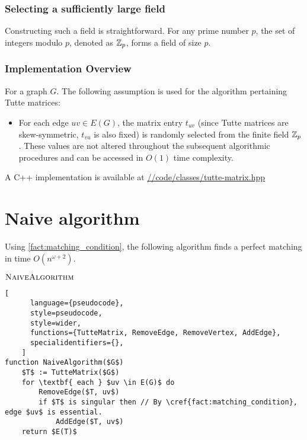 \subsubsection{Selecting a sufficiently large field}
Constructing such a field is straightforward. 
For any prime number \(p\), the set of integers modulo \(p\), denoted as \(\mathbb{Z}_{p}\), forms a field of size \(p\).

\subsubsection{Implementation Overview}

For a graph \(G\). The following assumption is used for the algorithm pertaining Tutte matrices:
\begin{itemize}
    \item For each edge \(uv \in E(G)\), the matrix entry \(t_{uv}\) (since Tutte matrices are skew-symmetric, \(t_{vu}\) is also fixed) is randomly selected from the finite field \(\mathbb{Z}_p\). 
    These values are not altered throughout the subsequent algorithmic procedures and can be accessed in $O(1)$ time complexity.
\end{itemize}
A C++ implementation is available at 
\href{https://github.com/antoniomsah/algebraic-max-matching/blob/main/code/classes/tutte-matrix.hpp}{//code/classes/tutte-matrix.hpp}

\newpage
\section{Naive algorithm}


Using \cref{fact:matching_condition}, the following algorithm finds a perfect matching in time \(O(n^{\omega+2})\).
\begin{programruledcaption}{\(\textsc{NaiveAlgorithm}\)}
    \label{alg:simple}
    \begin{lstlisting}[
      language={pseudocode},
      style=pseudocode,
      style=wider,
      functions={TutteMatrix, RemoveEdge, RemoveVertex, AddEdge},
      specialidentifiers={},
    ]
function NaiveAlgorithm($G$)
    $T$ := TutteMatrix($G$)
    for \textbf{ each } $uv \in E(G)$ do
        RemoveEdge($T, uv$)
        if $T$ is singular then // By \cref{fact:matching_condition}, edge $uv$ is essential.
            AddEdge($T, uv$)
    return $E(T)$
    \end{lstlisting}
\end{programruledcaption}

